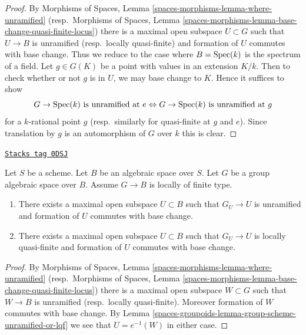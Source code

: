 \begin{proof}
By Morphisms of Spaces, Lemma \ref{spaces-morphisms-lemma-where-unramified}
(resp.\ Morphisms of Spaces, Lemma
\ref{spaces-morphisms-lemma-base-change-quasi-finite-locus})
there is a maximal open subspace $U \subset G$ such that $U \to B$ is
unramified (resp.\ locally quasi-finite) and formation of $U$
commutes with base change. Thus we reduce to the case where
$B = \operatorname{Spec}(k)$ is the spectrum of a field.
Let $g \in G(K)$ be a point with values in an extension $K/k$.
Then to check whether or not $g$ is in $U$, we may base
change to $K$. Hence it suffices to show
$$
G \to \operatorname{Spec}(k)\text{ is unramified at }e
\Leftrightarrow
G \to \operatorname{Spec}(k)\text{ is unramified at }g
$$
for a $k$-rational point $g$ (resp.\ similarly for
quasi-finite at $g$ and $e$). Since translation by $g$
is an automorphism of $G$ over $k$ this is clear.
\end{proof}

\begin{lemma}
\label{spaces-groupoids-lemma-open-over-which-unramified-or-lqf}
\href{https://stacks.math.columbia.edu/tag/0DSJ}{\texttt{Stacks tag 0DSJ}}

Let $S$ be a scheme. Let $B$ be an algebraic space over $S$.
Let $G$ be a group algebraic space over $B$. Assume $G \to B$
is locally of finite type.
\begin{enumerate}
\item There exists a maximal open subspace $U \subset B$
such that $G_U \to U$ is unramified and formation of $U$
commutes with base change.
\item There exists a maximal open subspace $U \subset B$
such that $G_U \to U$ is locally quasi-finite and formation of $U$
commutes with base change.
\end{enumerate}
\end{lemma}

\begin{proof}
By Morphisms of Spaces, Lemma \ref{spaces-morphisms-lemma-where-unramified}
(resp.\ Morphisms of Spaces, Lemma
\ref{spaces-morphisms-lemma-base-change-quasi-finite-locus})
there is a maximal open subspace $W \subset G$ such that $W \to B$ is
unramified (resp.\ locally quasi-finite). Moreover formation of $W$
commutes with base change.
By Lemma \ref{spaces-groupoids-lemma-group-scheme-unramified-or-lqf}
we see that $U = e^{-1}(W)$ in either case.
\end{proof}


